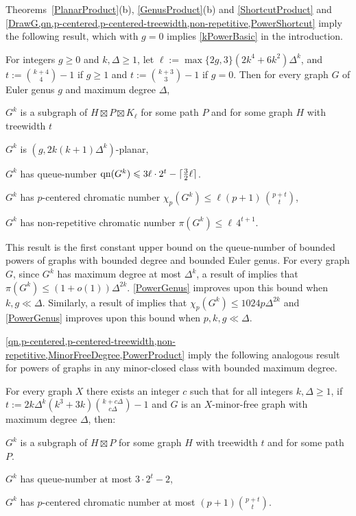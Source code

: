 \documentclass{patmorin}
\DeclareMathOperator{\qn}{qn}
\DeclarePairedDelimiter{\ceil}{\lceil}{\rceil}
\renewcommand{\le}{\leqslant}
\renewcommand{\geq}{\geqslant}
\renewcommand{\leq}{\leqslant}
\begin{document}
Theorems~\ref{PlanarProduct}(b), \ref{GenusProduct}(b) and \cref{ShortcutProduct} and  \cref{DrawG,qn,p-centered,p-centered-treewidth,non-repetitive,PowerShortcut} imply the following result, which with $g=0$ implies  \cref{kPowerBasic} in the introduction.

\begin{thm}
\label{PowerGenus}
For integers $g\geq 0$ and $k,\Delta\geq 1$, let $\ell:= \max\{2g,3\} (2k^4+6k^2) \Delta^{k}$, and $t:= \binom{k+4}{4}-1$ if $g\geq 1$ and $t:= \binom{k+3}{3}-1$ if $g=0$. Then for every graph $G$ of Euler genus $g$ and maximum degree $\Delta$,
\begin{compactitem}
\item $G^k$ is a subgraph of $H\boxtimes P \boxtimes K_{\ell}$ for some path $P$ and for some graph $H$ with treewidth $t$
\item $G^k$ is $(g, 2k(k+1)\Delta^{k} )$-planar,
\item $G^k$ has queue-number $\qn(G^k) \leq 3 \ell \cdot 2^t - \ceil{\tfrac{3}{2}\ell}$.
\item $G^k$ has  $p$-centered chromatic number $\chi_p(G^k) \leq \ell (p+1)\,  \binom{p+t}{t}$,
\item $G^k$ has  non-repetitive chromatic number $ \pi(G^k) \leq \ell \, 4^{t+1}$.
\end{compactitem}
\end{thm}

This result is the first constant upper bound on the queue-number of bounded powers of graphs with bounded degree and bounded Euler genus.  For every graph $G$, since $G^k$ has maximum degree at most $\Delta^k$, a result of \citet{DJKW16} implies that $\pi(G^k) \leq (1+o(1))\Delta^{2k}$. \cref{PowerGenus} improves upon this bound when $k,g\ll\Delta$.  Similarly, a result of \citet{DFMS21} implies that $\chi_p(G^k)\le 1024p\Delta^{2k}$ and \cref{PowerGenus} improves upon this bound when $p,k,g\ll\Delta$.

\cref{qn,p-centered,p-centered-treewidth,non-repetitive,MinorFreeDegree,PowerProduct} imply the following analogous result for powers of graphs in any minor-closed class with bounded maximum degree.

\begin{thm}
\label{PowerMinor}
For every graph $X$ there exists an integer $c$ such that for all integers $k,\Delta\geq 1$, if $t:= 2k\Delta^{k}(k^3+3k)\binom{k+c\Delta}{c\Delta}-1$ and $G$ is an $X$-minor-free graph with maximum degree $\Delta$, then:
\begin{compactitem}
	\item $G^k$ is a subgraph of $H\boxtimes P$ for some graph $H$ with treewidth $t$ and for some path $P$.
	\item $G^k$ has queue-number at most $3\cdot 2^t-2$,
	\item $G^k$ has $p$-centered chromatic number at most $(p+1)\binom{p+t}{t}$.
\end{compactitem}
\end{thm}
\end{document}

